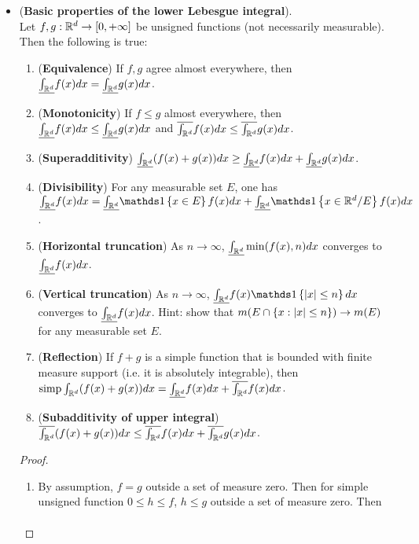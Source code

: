 \documentclass[11pt]{article}
\begin{document}
\begin{itemize}
\item \begin{proposition} (\textbf{Basic properties of the lower Lebesgue integral}).\\
Let $f, g : {\mathbb R}^d \rightarrow [0,+\infty]$ be unsigned functions (not necessarily measurable). Then the following is true: 
\begin{enumerate}
\item (\textbf{Equivalence}) If $f,g$ agree almost everywhere, then $\underline{\int_{{\mathbb R}^{d}}}f(x)dx = \underline{\int_{{\mathbb R}^{d}}}g(x)dx$.
\item (\textbf{Monotonicity}) If $f\le g$ almost everywhere, then $\underline{\int_{{\mathbb R}^{d}}}f(x)dx \le \underline{\int_{{\mathbb R}^{d}}}g(x)dx$ and $\overline{\int_{{\mathbb R}^{d}}}f(x)dx \le \overline{\int_{{\mathbb R}^{d}}}g(x)dx$.
\item (\textbf{Superadditivity}) $\underline{\int_{{\mathbb R}^{d}}}(f(x)+g(x))dx \ge \underline{\int_{{\mathbb R}^{d}}}f(x)dx + \underline{\int_{{\mathbb R}^{d}}}g(x)dx$.
\item (\textbf{Divisibility}) For any measurable set $E$, one has $\underline{\int_{\bR^{d}}}f(x)dx = \underline{\int_{\bR^{d}}}\ind{x\in E}f(x)dx+\underline{\int_{\bR^{d}}}\ind{x\in \bR^{d}/E}f(x)dx$.
\item (\textbf{Horizontal truncation}) As $n \rightarrow \infty$, $\underline{\int_{{\mathbb R}^{d}}}\min(f(x), n)dx$ converges to $\underline{\int_{{\mathbb R}^{d}}}f(x)dx$.
\item (\textbf{Vertical truncation}) As  $n \rightarrow \infty$, $\underline{\int_{\bR^{d}}}f(x)\ind{\abs{x}\le n}dx$ converges to
$\underline{\int_{{\mathbb R}^{d}}}f(x)dx$. Hint: show that  $m(E \cap \left\{x : \left\lvert x \right\rvert \le n\right\}) \rightarrow m(E)$ for any measurable set $E$.
\item (\textbf{Reflection}) If $f + g$ is a simple function that is bounded with finite measure support (i.e. it is absolutely integrable),
then $\text{simp}\int_{{\mathbb R}^{d}}(f(x)+g(x))dx = \underline{\int_{{\mathbb R}^{d}}}f(x)dx+ \overline{\int_{{\mathbb R}^{d}}}f(x)dx$.
\item (\textbf{Subadditivity of upper integral}) $\overline{\int_{{\mathbb R}^{d}}}(f(x)+g(x))dx \le \overline{\int_{{\mathbb R}^{d}}}f(x)dx + \overline{\int_{{\mathbb R}^{d}}}g(x)dx$.
\end{enumerate} 
\end{proposition}
\begin{proof}
\begin{enumerate}
\item By assumption, $f=g$ outside a set of measure zero. Then for simple unsigned function $0\le h\le f$, $h\le g$ outside a set of measure zero. Then  \begin{align*}

\end{align*}
\end{enumerate}
\end{proof}
\end{itemize}
\end{document}
